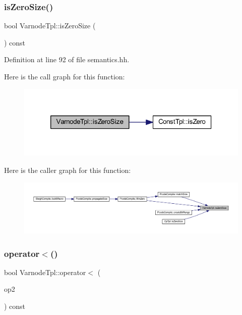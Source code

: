 \subsubsection{\texorpdfstring{isZeroSize()}{isZeroSize()}}
{\footnotesize\ttfamily bool Varnode\+Tpl\+::is\+Zero\+Size (\begin{DoxyParamCaption}\item[{void}]{ }\end{DoxyParamCaption}) const\hspace{0.3cm}{\ttfamily [inline]}}



Definition at line 92 of file semantics.\+hh.

Here is the call graph for this function\+:
\nopagebreak
\begin{figure}[H]
\begin{center}
\leavevmode
\includegraphics[width=320pt]{class_varnode_tpl_afb237a19b4a1a81572066ecec94bfa14_cgraph}
\end{center}
\end{figure}
Here is the caller graph for this function\+:
\nopagebreak
\begin{figure}[H]
\begin{center}
\leavevmode
\includegraphics[width=350pt]{class_varnode_tpl_afb237a19b4a1a81572066ecec94bfa14_icgraph}
\end{center}
\end{figure}
\mbox{\label{class_varnode_tpl_a3254e33a5648c3e580419af7e77340ed}} 
\subsubsection{\texorpdfstring{operator$<$()}{operator<()}}
{\footnotesize\ttfamily bool Varnode\+Tpl\+::operator$<$ (\begin{DoxyParamCaption}\item[{const \mbox{\hyperlink{class_varnode_tpl}{Varnode\+Tpl}} \&}]{op2 }\end{DoxyParamCaption}) const}



